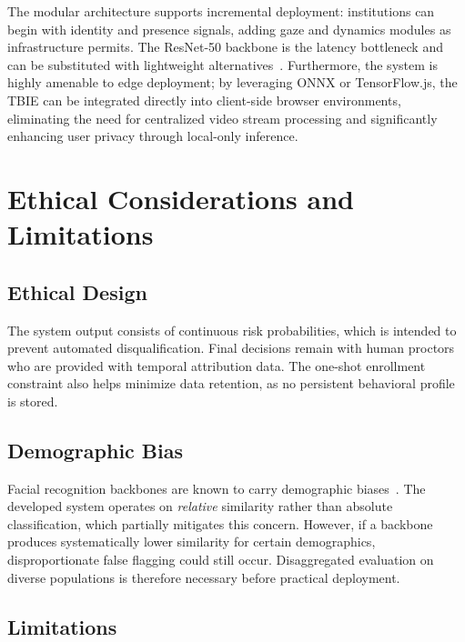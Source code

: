 \documentclass[journal]{IEEEtran}
\begin{document}
The modular architecture supports incremental deployment: institutions can begin with identity and presence signals, adding gaze and dynamics modules as infrastructure permits. The ResNet-50 backbone is the latency bottleneck and can be substituted with lightweight alternatives~\cite{Howard2019, Tan2019}. Furthermore, the system is highly amenable to edge deployment; by leveraging ONNX or TensorFlow.js, the TBIE can be integrated directly into client-side browser environments, eliminating the need for centralized video stream processing and significantly enhancing user privacy through local-only inference.


\section{Ethical Considerations and Limitations}
\label{sec:ethics}

\subsection{Ethical Design}

The system output consists of continuous risk probabilities, which is intended to prevent automated disqualification. Final decisions remain with human proctors who are provided with temporal attribution data. The one-shot enrollment constraint also helps minimize data retention, as no persistent behavioral profile is stored.

\subsection{Demographic Bias}

Facial recognition backbones are known to carry demographic biases~\cite{Buolamwini2018}. The developed system operates on \emph{relative} similarity rather than absolute classification, which partially mitigates this concern. However, if a backbone produces systematically lower similarity for certain demographics, disproportionate false flagging could still occur. Disaggregated evaluation on diverse populations is therefore necessary before practical deployment.

\subsection{Limitations}
\end{document}
